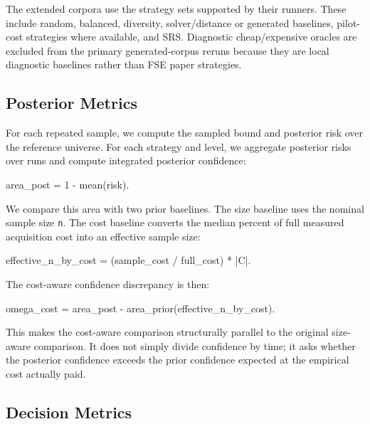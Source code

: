 \documentclass[smallcondensed]{svjour3}
\newenvironment{Shaded}{}{}
\newcommand{\NormalTok}[1]{#1}
\begin{document}
The extended corpora use the strategy sets supported by their runners.
These include random, balanced, diversity, solver/distance or generated
baselines, pilot-cost strategies where available, and SRS. Diagnostic
cheap/expensive oracles are excluded from the primary generated-corpus
reruns because they are local diagnostic baselines rather than FSE paper
strategies.

\subsection{Posterior Metrics}\label{posterior-metrics}

For each repeated sample, we compute the sampled bound and posterior
risk over the reference universe. For each strategy and level, we
aggregate posterior risks over runs and compute integrated posterior
confidence:

\begin{Shaded}
\begin{Highlighting}[]
\NormalTok{area\_post = 1 {-} mean(risk).}
\end{Highlighting}
\end{Shaded}

We compare this area with two prior baselines. The size baseline uses
the nominal sample size \texttt{n}. The cost baseline converts the
median percent of full measured acquisition cost into an effective
sample size:

\begin{Shaded}
\begin{Highlighting}[]
\NormalTok{effective\_n\_by\_cost = (sample\_cost / full\_cost) * |C|.}
\end{Highlighting}
\end{Shaded}

The cost-aware confidence discrepancy is then:

\begin{Shaded}
\begin{Highlighting}[]
\NormalTok{omega\_cost = area\_post {-} area\_prior(effective\_n\_by\_cost).}
\end{Highlighting}
\end{Shaded}

This makes the cost-aware comparison structurally parallel to the
original size-aware comparison. It does not simply divide confidence by
time; it asks whether the posterior confidence exceeds the prior
confidence expected at the empirical cost actually paid.

\subsection{Decision Metrics}\label{decision-metrics}
\end{document}
